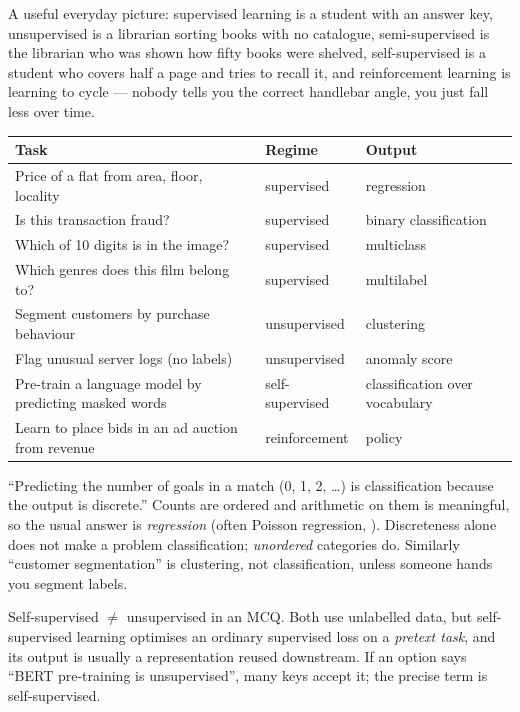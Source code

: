 A useful everyday picture: supervised learning is a student with an answer key, unsupervised is a
librarian sorting books with no catalogue, semi-supervised is the librarian who was shown how
fifty books were shelved, self-supervised is a student who covers half a page and tries to recall
it, and reinforcement learning is learning to cycle --- nobody tells you the correct handlebar angle,
you just fall less over time.

\begin{center}
	\small
	\begin{tabularx}{\linewidth}{>{\raggedright\arraybackslash}X l l}
		\toprule
		Task & Regime & Output \\
		\midrule
		Price of a flat from area, floor, locality & supervised & regression \\
		Is this transaction fraud? & supervised & binary classification \\
		Which of 10 digits is in the image? & supervised & multiclass \\
		Which genres does this film belong to? & supervised & multilabel \\
		Segment customers by purchase behaviour & unsupervised & clustering \\
		Flag unusual server logs (no labels) & unsupervised & anomaly score \\
		Pre-train a language model by predicting masked words & self-supervised & classification over vocabulary\\
		Learn to place bids in an ad auction from revenue & reinforcement & policy \\
		\bottomrule
	\end{tabularx}
\end{center}

\begin{remark}
	\trap ``Predicting the number of goals in a match (0, 1, 2, \dots) is classification because the
	output is discrete.'' Counts are ordered and arithmetic on them is meaningful, so the usual
	answer is \emph{regression} (often Poisson regression, ). Discreteness alone
	does not make a problem classification; \emph{unordered} categories do. Similarly
	``customer segmentation'' is clustering, not classification, unless someone hands you segment
	labels.
\end{remark}

\begin{remark}
	\trap Self-supervised $\neq$ unsupervised in an MCQ. Both use unlabelled data, but
	self-supervised learning optimises an ordinary supervised loss on a \emph{pretext task}, and its
	output is usually a representation reused downstream. If an option says ``BERT pre-training is
	unsupervised'', many keys accept it; the precise term is self-supervised.
\end{remark}

